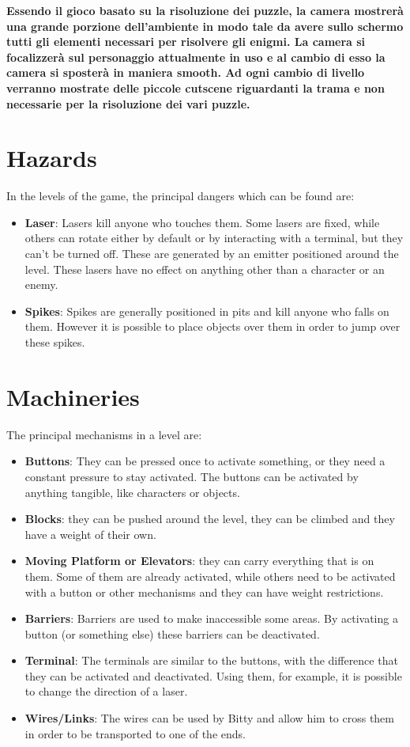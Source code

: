 \documentclass[12pt, a4paper]{report}
\begin{document}
\textbf{Essendo il gioco basato su la risoluzione dei puzzle, la camera mostrerà una grande porzione dell'ambiente in modo tale da avere sullo schermo tutti gli elementi necessari per risolvere gli enigmi. La camera si focalizzerà sul personaggio attualmente in uso e al cambio di esso la camera si sposterà in maniera smooth. Ad ogni cambio di livello verranno mostrate delle piccole cutscene riguardanti la trama e non necessarie per la risoluzione dei vari puzzle.}

\section*{Hazards}
In the levels of the game, the principal dangers which can be found are:
\begin{itemize}
	\item \textbf{Laser}: Lasers kill anyone who touches them. Some lasers are fixed, while others can rotate either by default or by interacting with a terminal, but they can't be turned off. These are generated by an emitter positioned around the level. These lasers have no effect on anything other than a character or an enemy.
	\item \textbf{Spikes}: Spikes are generally positioned in pits and kill anyone who falls on them. However it is possible to place objects over them in order to jump over these spikes.
\end{itemize}

\section*{Machineries}
The principal mechanisms in a level are:
\begin{itemize}
	\item \textbf{Buttons}: They can be pressed once to activate something, or they need a constant pressure to stay activated. The buttons can be activated by anything tangible, like characters or objects.
	\item \textbf{Blocks}: they can be pushed around the level, they can be climbed and they have a weight of their own.
	\item \textbf{Moving Platform or Elevators}: they can carry everything that is on them. Some of them are already activated, while others need to be activated with a button or other mechanisms and they can have weight restrictions.
	\item \textbf{Barriers}: Barriers are used to make inaccessible some areas. By activating a button (or something else) these barriers can be deactivated.
	\item \textbf{Terminal}: The terminals are similar to the buttons, with the difference that they can be activated and deactivated. Using them, for example, it is possible to change the direction of a laser.
	\item \textbf{Wires/Links}: The wires can be used by Bitty and allow him to cross them in order to be transported to one of the ends.
\end{itemize}
\end{document}
